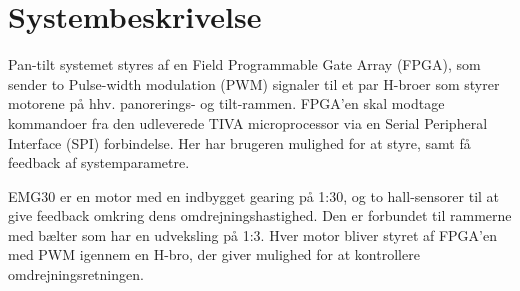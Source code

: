 \section{Systembeskrivelse}

Pan-tilt systemet styres af en Field Programmable Gate Array (FPGA), som sender to Pulse-width modulation (PWM) signaler til et par H-broer som styrer motorene på hhv. panorerings- og tilt-rammen.
FPGA’en skal modtage kommandoer fra den udleverede TIVA microprocessor via en Serial Peripheral Interface (SPI) forbindelse.
Her har brugeren mulighed for at styre, samt få feedback af systemparametre.

EMG30\cite{emg30Data} er en motor med en indbygget gearing på 1:30, og to hall-sensorer til at give feedback omkring dens omdrejningshastighed. Den er forbundet til rammerne med bælter som har en udveksling på 1:3. Hver motor bliver styret af FPGA'en med PWM igennem en H-bro, der giver mulighed for at kontrollere omdrejningsretningen.